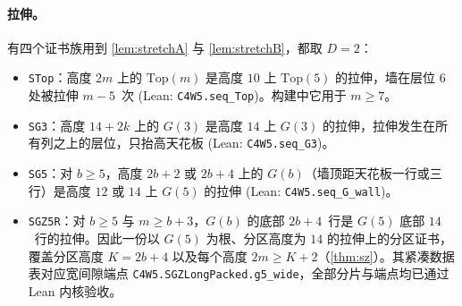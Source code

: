 \documentclass[11pt,a4paper]{article}
\theoremstyle{zhthm}
\newcommand{\code}[1]{{\upshape\texttt{\small\nolinkurl{#1}}}}
\newcommand{\leanref}[1]{(Lean: \code{#1})}
\newcommand{\Top}{\mathrm{Top}}
\begin{document}
\paragraph{拉伸。}有四个证书族用到 \cref{lem:stretchA} 与 \cref{lem:stretchB}，都取 $D=2$：
\begin{itemize}
  \item \code{STop}：高度 $2m$ 上的 $\Top(m)$ 是高度 $10$ 上 $\Top(5)$ 的拉伸，墙在层位 $6$ 处被拉伸 $m-5$~次 \leanref{C4W5.seq_Top}。构建中它用于 $m\ge 7$。
  \item \code{SG3}：高度 $14+2k$ 上的 $G(3)$ 是高度 $14$ 上 $G(3)$ 的拉伸，拉伸发生在所有列之上的层位，只抬高天花板 \leanref{C4W5.seq_G3}。
  \item \code{SG5}：对 $b\ge 5$，高度 $2b+2$ 或 $2b+4$ 上的 $G(b)$（墙顶距天花板一行或三行）是高度 $12$ 或 $14$ 上 $G(5)$ 的拉伸 \leanref{C4W5.seq_G_wall}。
  \item \code{SGZ5R}：对 $b\ge 5$ 与 $m\ge b+3$，$G(b)$ 的底部 $2b+4$~行是 $G(5)$ 底部 $14$~行的拉伸。因此一份以 $G(5)$ 为根、分区高度为 $14$ 的拉伸上的分区证书，覆盖分区高度 $K=2b+4$ 以及每个高度 $2m\ge K+2$（\cref{thm:sz}）。其紧凑数据表对应宽间隙端点 \code{C4W5.SGZLongPacked.g5_wide}，全部分片与端点均已通过 Lean 内核验收。
\end{itemize}
\end{document}
